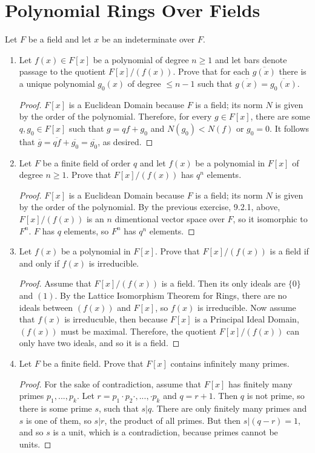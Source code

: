 \documentclass{report}
\begin{document}
\section{Polynomial Rings Over Fields}
Let $F$ be a field and let $x$ be an indeterminate over $F$.
\begin{enumerate}
	\item Let $f(x)\in F[x]$ be a polynomial of degree $n\geq 1$ and let bars denote passage to the quotient $F[x]/(f(x))$. 
	Prove that for each $\overline{g(x)}$ there is a unique polynomial $g_0(x)$ of degree $\leq n-1$ such that $\overline{g(x)}=\overline{g_0(x)}$.
	\begin{proof}
		$F[x]$ is a Euclidean Domain because $F$ is a field; its norm $N$ is given by the order of the polynomial.
		Therefore, for every $g\in F[x]$, there are some $q,g_0\in F[x]$ such that $g=qf+g_0$ and $N(g_0)<N(f)$ or $g_0=0$.
		It follows that $\overline{g}=\overline{qf}+\overline{g_0}=\overline{g_0}$, as desired.
	\end{proof}
	
	\item Let $F$ be a finite field of order $q$ and let $f(x)$ be a polynomial in $F[x]$ of degree $n\geq 1$.
	Prove that $F[x]/(f(x))$ has $q^n$ elements.
	\begin{proof}
		$F[x]$ is a Euclidean Domain because $F$ is a field; its norm $N$ is given by the order of the polynomial.
		By the previous exercise, 9.2.1, above, $F[x]/(f(x))$ is an $n$ dimentional vector space over $F$, so it isomorphic to $F^n$.
		$F$ has $q$ elements, so $F^n$ has $q^n$ elements.
	\end{proof}
	
	\item Let $f(x)$ be a polynomial in $F[x]$. Prove that $F[x]/(f(x))$ is a field if and only if $f(x)$ is irreducible.
	\begin{proof}
		Assume that $F[x]/(f(x))$ is a field. Then its only ideals are $\{0\}$ and $(1)$. By the Lattice Isomorphism Theorem for Rings,
		there are no ideals between $(f(x))$ and $F[x]$, so $f(x)$ is irreducible.
		Now assume that $f(x)$ is irreducuble, then because $F[x]$ is a Principal Ideal Domain, $(f(x))$ must be maximal.
		Therefore, the quotient $F[x]/(f(x))$ can only have two ideals, and so it is a field.
	\end{proof}
	
	\item Let $F$ be a finite field. Prove that $F[x]$ contains infinitely many primes.
	\begin{proof}
		For the sake of contradiction, assume that $F[x]$ has finitely many primes $p_1,...,p_k$.
		Let $r=p_1\cdot p_2\cdot,...,\cdot p_k$ and $q = r+1$. Then $q$ is not prime, so there is some prime $s$, such that $s|q$.
		There are only finitely many primes and $s$ is one of them, so $s|r$, the product of all primes.
		But then $s|(q-r)=1$, and so $s$ is a unit, which is a contradiction, because primes cannot be units.
	\end{proof}
	

\end{enumerate}
\end{document}
